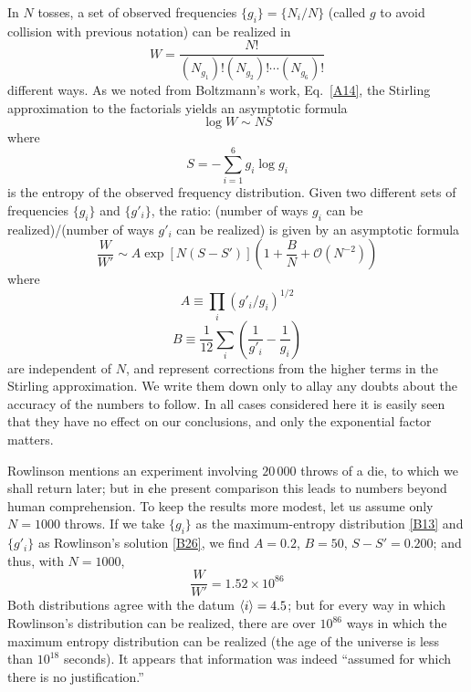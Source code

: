 In $N$ tosses, a set of observed frequencies $\{g_i\}= \{N_i/N\}$ (called $g$ to avoid collision with previous notation) can be realized in
\begin{equation}
	\label{B27}
	W = \frac{N!}{(N_{g_1})! (N_{g_2})! \cdots (N_{g_6})!}
\end{equation}
different ways. As we noted from Boltzmann's work, Eq.~\eqref{A14}, the Stirling approximation to the factorials yields an asymptotic formula
\begin{equation}
	\label{B28}
	\log W \sim NS
\end{equation}
where
\begin{equation}
	\label{B29}
	S = -\sum_{i=1}^{6} g_i \log g_i
\end{equation}
is the entropy of the observed frequency distribution.
Given two different sets of frequencies $\{g_i\}$ and $\{g'_i\}$, the ratio: (number of ways $g_i$ can be realized)/(number of ways $g'_i$ can be realized) is given by an asymptotic formula
\begin{equation}
	\label{B30}
	\frac{W	}{W'} \sim A \exp[N(S-S')] \left(1 + \frac{B}{N} + \mathcal{O}\left(N^{-2}\right)\right)
\end{equation}
where
\begin{equation}
	\label{B31}
	A \equiv \prod_{i} (g'_i/g_i)^{1/2}
\end{equation}
\begin{equation}
	\label{B32}
	B \equiv \frac{1}{12}\sum_{i} \left(\frac{1}{g'_i} - \frac{1}{g_i}\right)
\end{equation}
are independent of $N$, and represent corrections from the higher terms in the Stirling approximation.
We write them down only to allay any doubts about the accuracy of the numbers to follow.
In all cases considered here it is easily seen that they have no effect on our conclusions, and only the exponential factor matters.

Rowlinson mentions an experiment involving $20\,000$ throws of a die, to which we shall return later; but in ¢he present comparison this leads to numbers beyond human comprehension.
To keep the results more modest, let us assume only $N = 1000$ throws.
If we take $\{g_i\}$ as the maximum-entropy distribution \eqref{B13} and $\{g'_i\}$ as Rowlinson's solution \eqref{B26}, we find $A = 0.2$, $B = 50$, $S-S' = 0.200$; and thus, with $N = 1000$,
\begin{equation}
	\label{B34}  %
	\frac{W	}{W'} = 1.52 \times 10^{86}
\end{equation}
Both distributions agree with the datum $\langle i\rangle = 4.5$; but for every way in which Rowlinson's distribution can be realized, there are over $10^{86}$ ways in which the maximum entropy distribution can be realized (the age of the universe is less than $10^{18}$ seconds).
It appears that information was indeed ``assumed for which there is no justification.''

